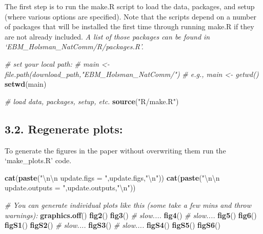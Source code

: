 \documentclass[]{article}
\newenvironment{Shaded}{\begin{snugshade}}{\end{snugshade}}
\newcommand{\KeywordTok}[1]{\textcolor[rgb]{0.13,0.29,0.53}{\textbf{{#1}}}}
\newcommand{\CharTok}[1]{\textcolor[rgb]{0.31,0.60,0.02}{{#1}}}
\newcommand{\StringTok}[1]{\textcolor[rgb]{0.31,0.60,0.02}{{#1}}}
\newcommand{\CommentTok}[1]{\textcolor[rgb]{0.56,0.35,0.01}{\textit{{#1}}}}
\newcommand{\NormalTok}[1]{{#1}}
\begin{document}
The first step is to run the make.R script to load the data, packages,
and setup (where various options are specified). Note that the scripts
depend on a number of packages that will be installed the first time
through running make.R if they are not already included. \emph{A list of
those packages can be found in `EBM\_Holsman\_NatComm/R/packages.R'.}

\begin{Shaded}
\begin{Highlighting}[]
    \CommentTok{# set your local path:}
    \CommentTok{# main        <-  file.path(download_path,"EBM_Holsman_NatComm/")}
    \CommentTok{# e.g., main  <-  getwd()}
    \KeywordTok{setwd}\NormalTok{(main)}
    
    \CommentTok{# load data, packages, setup, etc.}
    \KeywordTok{source}\NormalTok{(}\StringTok{"R/make.R"}\NormalTok{)}
\end{Highlighting}
\end{Shaded}

\subsection{3.2. Regenerate plots:}\label{regenerate-plots}

To generate the figures in the paper without overwriting them run the
`make\_plots.R' code.

\begin{Shaded}
\begin{Highlighting}[]
    \KeywordTok{cat}\NormalTok{(}\KeywordTok{paste}\NormalTok{(}\StringTok{"}\CharTok{\textbackslash{}n\textbackslash{}n}\StringTok{ update.figs  = "}\NormalTok{,update.figs,}\StringTok{"}\CharTok{\textbackslash{}n}\StringTok{"}\NormalTok{))}
    \KeywordTok{cat}\NormalTok{(}\KeywordTok{paste}\NormalTok{(}\StringTok{"}\CharTok{\textbackslash{}n\textbackslash{}n}\StringTok{ update.outputs  = "}\NormalTok{,update.outputs,}\StringTok{"}\CharTok{\textbackslash{}n}\StringTok{"}\NormalTok{))}

    \CommentTok{# You can generate individual plots like this (some take a few mins and throw warnings):}
    \KeywordTok{graphics.off}\NormalTok{()}
    \KeywordTok{fig2}\NormalTok{()}
    \KeywordTok{fig3}\NormalTok{() }\CommentTok{#  slow....}
    \KeywordTok{fig4}\NormalTok{() }\CommentTok{#  slow....}
    \KeywordTok{fig5}\NormalTok{()}
    \KeywordTok{fig6}\NormalTok{()}
    \KeywordTok{figS1}\NormalTok{()}
    \KeywordTok{figS2}\NormalTok{() }\CommentTok{#  slow....}
    \KeywordTok{figS3}\NormalTok{() }\CommentTok{#  slow....}
    \KeywordTok{figS4}\NormalTok{()}
    \KeywordTok{figS5}\NormalTok{()}
    \KeywordTok{figS6}\NormalTok{()}
\end{Highlighting}
\end{Shaded}
\end{document}
